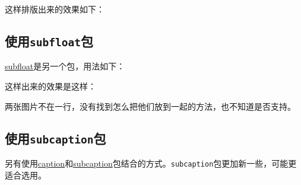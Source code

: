\documentclass[12pt]{article}
\begin{document}
这样排版出来的效果如下：

\subsection{\texorpdfstring{使用\texttt{subfloat}包}{使用subfloat包}}\label{ux4f7fux7528subfloatux5305}

\href{www.ctan.org/pkg/subfloat}{subfloat}是另一个包，用法如下：

\begin{Shaded}
\begin{Highlighting}[]
\NormalTok{\{}\NormalTok{\}}
\NormalTok{\{}\NormalTok{\}}
    \NormalTok{\{}
        \NormalTok{[width=0.4}\NormalTok{, height=80pt]\{}\NormalTok{\}}
\NormalTok{    \}}
\NormalTok{\{}\NormalTok{\}}
\NormalTok{\{}\NormalTok{\}}
    \NormalTok{\{}
        \NormalTok{[width=0.4}\NormalTok{, height=80pt]\{}\NormalTok{\}}
\NormalTok{    \}}
\NormalTok{\{}\NormalTok{\}}
\NormalTok{\{}\NormalTok{\}}
\end{Highlighting}
\end{Shaded}

这样出来的效果是这样：

两张图片不在一行，没有找到怎么把他们放到一起的方法，也不知道是否支持。

\subsection{\texorpdfstring{使用\texttt{subcaption}包}{使用subcaption包}}\label{ux4f7fux7528subcaptionux5305}

另有使用\href{http://www.ctan.org/pkg/caption}{caption}和\href{http://www.ctan.org/pkg/subcaption}{subcaption}包结合的方式。\texttt{subcaption}包更加新一些，可能更适合选用。
\end{document}
